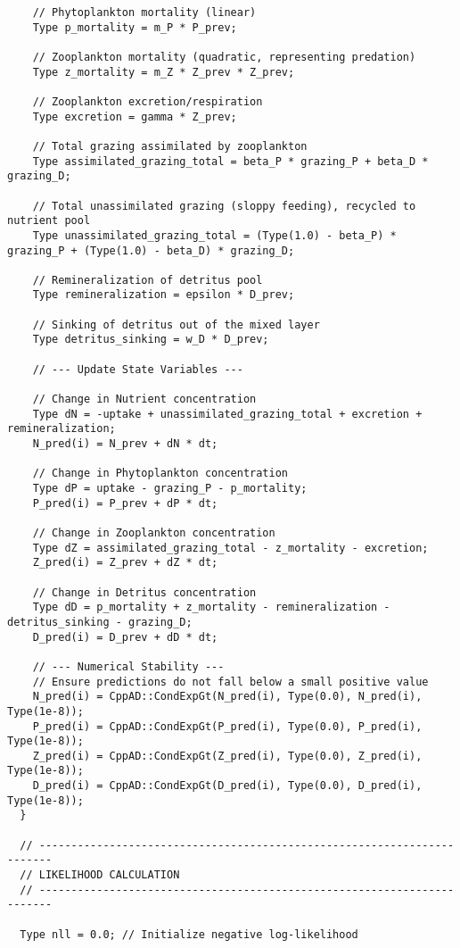 \begin{lstlisting}
    // Phytoplankton mortality (linear)
    Type p_mortality = m_P * P_prev;

    // Zooplankton mortality (quadratic, representing predation)
    Type z_mortality = m_Z * Z_prev * Z_prev;

    // Zooplankton excretion/respiration
    Type excretion = gamma * Z_prev;

    // Total grazing assimilated by zooplankton
    Type assimilated_grazing_total = beta_P * grazing_P + beta_D * grazing_D;

    // Total unassimilated grazing (sloppy feeding), recycled to nutrient pool
    Type unassimilated_grazing_total = (Type(1.0) - beta_P) * grazing_P + (Type(1.0) - beta_D) * grazing_D;

    // Remineralization of detritus pool
    Type remineralization = epsilon * D_prev;

    // Sinking of detritus out of the mixed layer
    Type detritus_sinking = w_D * D_prev;

    // --- Update State Variables ---
    
    // Change in Nutrient concentration
    Type dN = -uptake + unassimilated_grazing_total + excretion + remineralization;
    N_pred(i) = N_prev + dN * dt;

    // Change in Phytoplankton concentration
    Type dP = uptake - grazing_P - p_mortality;
    P_pred(i) = P_prev + dP * dt;

    // Change in Zooplankton concentration
    Type dZ = assimilated_grazing_total - z_mortality - excretion;
    Z_pred(i) = Z_prev + dZ * dt;

    // Change in Detritus concentration
    Type dD = p_mortality + z_mortality - remineralization - detritus_sinking - grazing_D;
    D_pred(i) = D_prev + dD * dt;

    // --- Numerical Stability ---
    // Ensure predictions do not fall below a small positive value
    N_pred(i) = CppAD::CondExpGt(N_pred(i), Type(0.0), N_pred(i), Type(1e-8));
    P_pred(i) = CppAD::CondExpGt(P_pred(i), Type(0.0), P_pred(i), Type(1e-8));
    Z_pred(i) = CppAD::CondExpGt(Z_pred(i), Type(0.0), Z_pred(i), Type(1e-8));
    D_pred(i) = CppAD::CondExpGt(D_pred(i), Type(0.0), D_pred(i), Type(1e-8));
  }

  // ------------------------------------------------------------------------
  // LIKELIHOOD CALCULATION
  // ------------------------------------------------------------------------

  Type nll = 0.0; // Initialize negative log-likelihood


\end{lstlisting}

